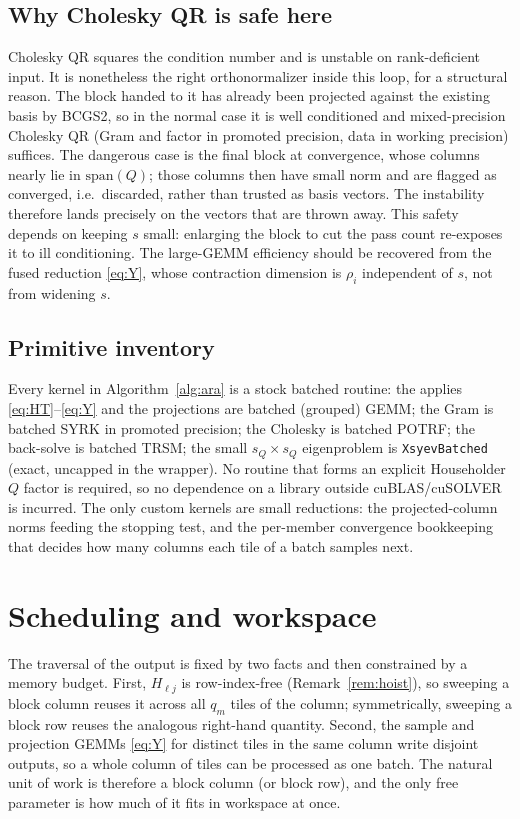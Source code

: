 \documentclass[11pt]{article}
\begin{document}
\subsection{Why Cholesky QR is safe here}
\label{sec:cholqr}

Cholesky QR squares the condition number and is unstable on rank-deficient input.
It is nonetheless the right orthonormalizer inside this loop, for a structural
reason. The block handed to it has already been projected against the existing
basis by BCGS2, so in the normal case it is well conditioned and mixed-precision
Cholesky QR (Gram and factor in promoted precision, data in working precision)
suffices. The dangerous case is the final block at convergence, whose columns
nearly lie in $\mathrm{span}(Q)$; those columns then have small norm and are
flagged as converged, i.e.\ discarded, rather than trusted as basis vectors. The
instability therefore lands precisely on the vectors that are thrown away. This
safety depends on keeping $s$ small: enlarging the block to cut the pass count
re-exposes it to ill conditioning. The large-GEMM efficiency should be recovered
from the fused reduction \eqref{eq:Y}, whose contraction dimension is $\rho_i$
independent of $s$, not from widening $s$.

\subsection{Primitive inventory}
\label{sec:primitives}

Every kernel in Algorithm~\ref{alg:ara} is a stock batched routine:
the applies \eqref{eq:HT}--\eqref{eq:Y} and the projections are batched
(grouped) GEMM; the Gram is batched SYRK in promoted precision; the Cholesky is
batched POTRF; the back-solve is batched TRSM; the small $s_Q\times s_Q$
eigenproblem is \texttt{XsyevBatched} (exact, uncapped in the wrapper). No
routine that forms an explicit Householder $Q$ factor is required, so no
dependence on a library outside cuBLAS/cuSOLVER is incurred. The only custom kernels are
small reductions: the projected-column norms feeding the stopping test, and the
per-member convergence bookkeeping that decides how many columns each tile of a
batch samples next.

\section{Scheduling and workspace}
\label{sec:schedule}

The traversal of the output is fixed by two facts and then constrained by a
memory budget. First, $H_{\ell j}$ is row-index-free (Remark~\ref{rem:hoist}), so
sweeping a block column reuses it across all $q_m$ tiles of the column;
symmetrically, sweeping a block row reuses the analogous right-hand quantity.
Second, the sample and projection GEMMs \eqref{eq:Y} for distinct tiles in the
same column write disjoint outputs, so a whole column of tiles can be processed
as one batch. The natural unit of work is therefore a block column (or block
row), and the only free parameter is how much of it fits in workspace at once.
\end{document}
